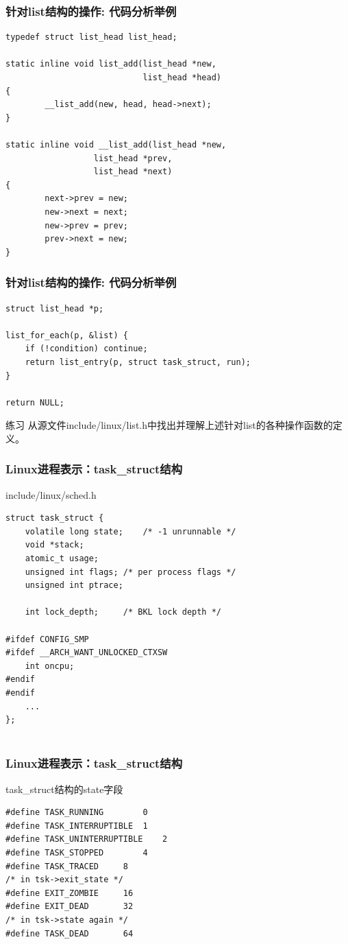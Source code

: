 \documentclass[xcolor=svgnames]{beamer}
\begin{document}
\begin{CJK*}{UTF8}{gbsn}
\begin{frame}[fragile]
\frametitle{针对list结构的操作: 代码分析举例}
\begin{verbatim}
typedef struct list_head list_head;

static inline void list_add(list_head *new, 
                            list_head *head)
{
        __list_add(new, head, head->next);
}

static inline void __list_add(list_head *new,
                  list_head *prev,
                  list_head *next)
{
        next->prev = new;
        new->next = next;
        new->prev = prev;
        prev->next = new;
}
\end{verbatim}
\end{frame}

\begin{frame}[fragile]
\frametitle{针对list结构的操作: 代码分析举例}
\begin{verbatim}
struct list_head *p;

list_for_each(p, &list) {
    if (!condition) continue;
    return list_entry(p, struct task_struct, run);
}

return NULL;
\end{verbatim}
\begin{block}{练习}
从源文件include/linux/list.h中找出并理解上述针对list的各种操作函数的定义。
\end{block}
\end{frame}


\begin{frame}[fragile]
\frametitle{Linux进程表示：task\_struct结构}
\begin{block}{include/linux/sched.h}
\begin{verbatim}
struct task_struct {
    volatile long state;    /* -1 unrunnable */
    void *stack;
    atomic_t usage;
    unsigned int flags; /* per process flags */
    unsigned int ptrace;

    int lock_depth;     /* BKL lock depth */

#ifdef CONFIG_SMP
#ifdef __ARCH_WANT_UNLOCKED_CTXSW
    int oncpu;
#endif
#endif
    ...
};


\end{verbatim}
\end{block}
\end{frame}

\begin{frame}[fragile]
\frametitle{Linux进程表示：task\_struct结构}
\begin{block}{task\_struct结构的state字段}
\begin{verbatim}
#define TASK_RUNNING        0
#define TASK_INTERRUPTIBLE  1
#define TASK_UNINTERRUPTIBLE    2
#define TASK_STOPPED        4
#define TASK_TRACED     8
/* in tsk->exit_state */
#define EXIT_ZOMBIE     16
#define EXIT_DEAD       32
/* in tsk->state again */
#define TASK_DEAD       64
\end{verbatim}
\end{block}
\end{frame}


\end{CJK*}
\end{document}
